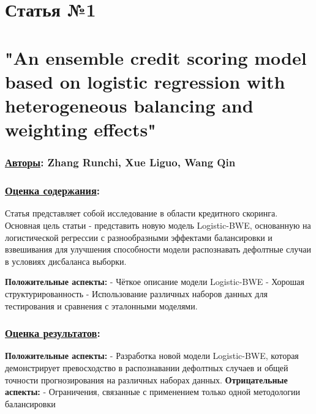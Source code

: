 \documentclass[a4paper,14pt]{article}
\begin{document}
\newpage
\section*{Статья №1}
\section*{"An ensemble credit scoring model based on logistic regression with heterogeneous balancing and weighting effects"}
\subsubsection*{\underline {Авторы}: Zhang Runchi, Xue Liguo, Wang Qin}
\vspace{14pt}
\subsubsection*{\underline{Оценка содержания}:}
Статья представляет собой исследование в области кредитного скоринга. Основная цель статьи - представить новую модель Logistic-BWE, основанную на логистической регрессии с разнообразными эффектами балансировки и взвешивания для улучшения способности модели распознавать дефолтные случаи в условиях дисбаланса выборки. \vspace{1pt} \newline 

\textbf{Положительные аспекты}\textbf{:} \newline
- Чёткое описание модели Logistic-BWE \newline
- Хорошая структурированность \newline
- Использование различных наборов данных для тестирования и сравнения с эталонными моделями. \newline
\subsubsection*{\underline{Оценка результатов}:}
\textbf{Положительные аспекты:} \newline
- Разработка новой модели Logistic-BWE, которая демонстрирует превосходство в распознавании дефолтных случаев и общей точности прогнозирования на различных наборах данных. \vspace{1pt}  \newline
\textbf{Отрицательные аспекты:} \newline
- Ограничения, связанные с применением только одной методологии балансировки \newline
\end{document}
